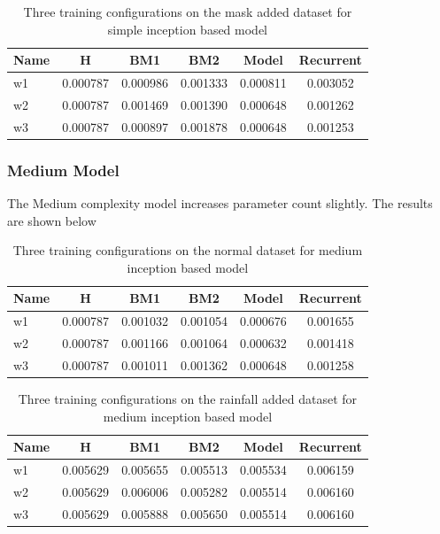 \begin{table}[htbp]
	\centering
	\caption{Three training configurations on the mask added dataset for simple inception based model}
	\label{tab:simple_mask}
	\begin{tabular}{p{2cm}ccccc}
		\toprule
		Name &  H &  BM1 &  BM2 &  Model &  Recurrent \\
		\midrule
		w1 &       0.000787 &        0.000986 &        0.001333 &   0.000811 &            0.003052 \\
		w2 &       0.000787 &        0.001469 &        0.001390 &   0.000648 &            0.001262 \\
		w3 &       0.000787 &        0.000897 &        0.001878 &   0.000648 &            0.001253 \\
		\bottomrule
	\end{tabular}
\end{table}


\subsubsection*{Medium Model}
The Medium complexity model increases parameter count slightly. The results are shown below
\begin{table}[htbp]
	\centering
	\caption{Three training configurations on the normal dataset for medium inception based model}
	\label{tab:medium_normal}
	\begin{tabular}{p{2cm}ccccc}
		\toprule
		Name &  H &  BM1 &  BM2 &  Model &  Recurrent \\
		\midrule
		w1 &       0.000787 &        0.001032 &        0.001054 &   0.000676 &            0.001655 \\
		w2 &       0.000787 &        0.001166 &        0.001064 &   0.000632 &            0.001418 \\
		w3 &       0.000787 &        0.001011 &        0.001362 &   0.000648 &            0.001258 \\
		\bottomrule
	\end{tabular}
\end{table}

\begin{table}[htbp]
	\centering
	\caption{Three training configurations on the rainfall added dataset for medium inception based model}
	\label{tab:medium_rf}
	\begin{tabular}{p{2cm}ccccc}
		\toprule
		Name &  H &  BM1 &  BM2 &  Model &  Recurrent \\
		\midrule
		w1 &       0.005629 &        0.005655 &        0.005513 &   0.005534 &            0.006159 \\
		w2 &       0.005629 &        0.006006 &        0.005282 &   0.005514 &            0.006160 \\
		w3 &       0.005629 &        0.005888 &        0.005650 &   0.005514 &            0.006160 \\
		\bottomrule
	\end{tabular}
\end{table}

